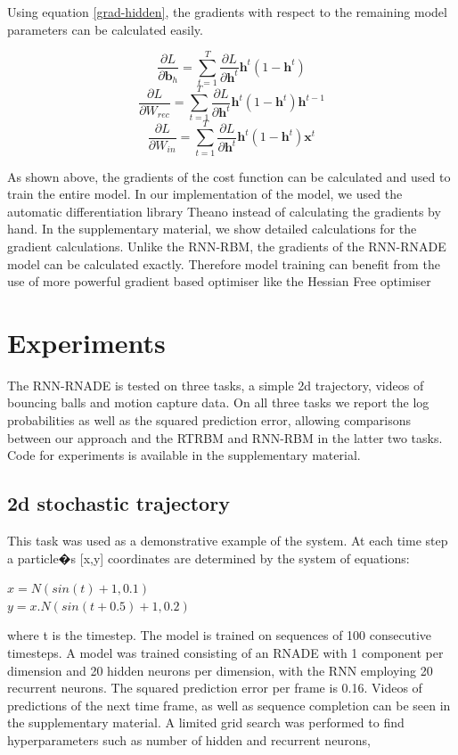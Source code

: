 \documentclass{article} %
\begin{document}
Using equation \ref{grad-hidden}, the gradients with respect to the remaining model parameters can be calculated easily. 

$$ \frac{\partial L}{\partial \mathbf{b}_{h}} =  \sum_{t=1}^{T} \frac{\partial L}{\partial \mathbf{h}^t} \mathbf{h}^t (1 - \mathbf{h}^t)$$
$$ \frac{\partial L}{\partial W_{rec}} = \sum_{t=1}^{T} \frac{\partial L}{\partial \mathbf{h}^t} \mathbf{h}^t (1 - \mathbf{h}^t) \mathbf{h}^{t-1}$$
$$ \frac{\partial L}{\partial W_{in}} = \sum_{t=1}^{T} \frac{\partial L}{\partial \mathbf{h}^t} \mathbf{h}^t (1 - \mathbf{h}^t) \mathbf{x}^{t}$$

As shown above, the gradients of the cost function can be calculated and used to train the entire model. In our implementation of the model, we used the automatic differentiation library Theano \cite{bergstra+al:2010-scipy} instead of calculating the gradients by hand. In the supplementary material, we show detailed calculations for the gradient calculations. Unlike the RNN-RBM, the gradients of the RNN-RNADE model can be calculated exactly. Therefore model training can benefit from the use of more powerful gradient based optimiser like the Hessian Free optimiser \cite{Martens2011}

\section{Experiments}
\label{Experiments}
The RNN-RNADE is tested on three tasks, a simple 2d trajectory, videos of bouncing balls and motion capture data. On all three tasks we report the log probabilities as well as the squared prediction error, allowing comparisons between our approach and the RTRBM and RNN-RBM in the latter two tasks. Code for experiments is available in the supplementary material.

\subsection{2d stochastic trajectory}
This task was used as a demonstrative example of the system. At each time step a particle�s [x,y] coordinates are determined by the system of equations:

\(x = N(sin(t)+1,0.1)\)\\
\(y = x .N(sin(t+0.5)+1,0.2)\)

where t is the timestep. The model is trained on sequences of 100 consecutive timesteps. A model was trained consisting of an RNADE with 1 component per dimension and 20 hidden neurons per dimension, with the RNN employing 20 recurrent neurons. The squared prediction error per frame is 0.16. Videos of predictions of the next time frame, as well as sequence completion can be seen in the supplementary material. A limited grid search was performed to find hyperparameters such as number of hidden and recurrent neurons, 
\end{document}
